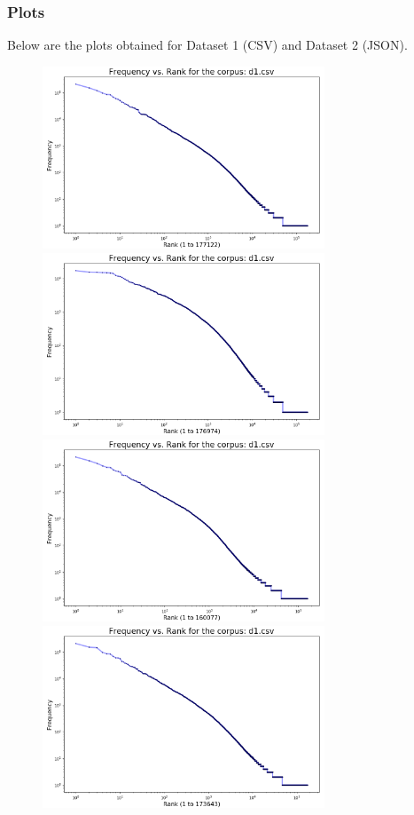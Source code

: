 \documentclass{article}
\begin{document}
\subsubsection{Plots}
\begin{flushleft}
Below are the plots obtained for Dataset 1 (CSV) and Dataset 2 (JSON).
\begin{figure}[H]
\begin{minipage}{0.45\linewidth}
\includegraphics[width=0.75\textwidth]{./images/dataset-1-t1-0.png}
\includegraphics[width=0.75\textwidth]{./images/dataset-1-t1-1.png}
\includegraphics[width=0.75\textwidth]{./images/dataset-1-t1-2.png}
\includegraphics[width=0.75\textwidth]{./images/dataset-1-t1-3.png}

\end{minipage}
\end{figure}
\end{flushleft}
\end{document}
